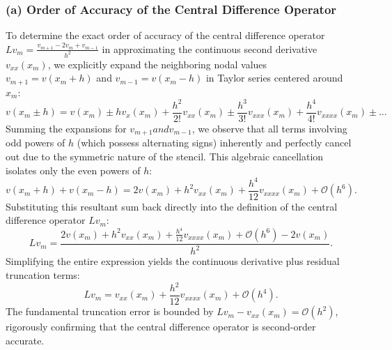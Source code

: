 \begin{solution}
\subsubsection*{(a) Order of Accuracy of the Central Difference Operator}
To determine the exact order of accuracy of the central difference operator $L v_m = \frac{v_{m+1} - 2v_m + v_{m-1}}{h^2}$ in approximating the continuous second derivative $v_{xx}(x_m)$, we explicitly expand the neighboring nodal values $v_{m+1} = v(x_m + h)$ and $v_{m-1} = v(x_m - h)$ in Taylor series centered around $x_m$:
\[
v(x_m \pm h) = v(x_m) \pm h v_x(x_m) + \frac{h^2}{2!} v_{xx}(x_m) \pm \frac{h^3}{3!} v_{xxx}(x_m) + \frac{h^4}{4!} v_{xxxx}(x_m) \pm \dots
\]
Summing the expansions for $v_{m+1} and v_{m-1}$, we observe that all terms involving odd powers of $h$ (which possess alternating signs) inherently and perfectly cancel out due to the symmetric nature of the stencil.
This algebraic cancellation isolates only the even powers of $h$:
\[
v(x_m + h) + v(x_m - h) = 2v(x_m) + h^2 v_{xx}(x_m) + \frac{h^4}{12} v_{xxxx}(x_m) + \mathcal{O}(h^6).
\]
Substituting this resultant sum back directly into the definition of the central difference operator $L v_m$:
\[
L v_m = \frac{2v(x_m) + h^2 v_{xx}(x_m) + \frac{h^4}{12} v_{xxxx}(x_m) + \mathcal{O}(h^6) - 2v(x_m)}{h^2}.
\]
Simplifying the entire expression yields the continuous derivative plus residual truncation terms:
\[
L v_m = v_{xx}(x_m) + \frac{h^2}{12} v_{xxxx}(x_m) + \mathcal{O}(h^4).
\]
The fundamental truncation error is bounded by $L v_m - v_{xx}(x_m) = \mathcal{O}(h^2)$, rigorously confirming that the central difference operator is second-order accurate.


\end{solution}
